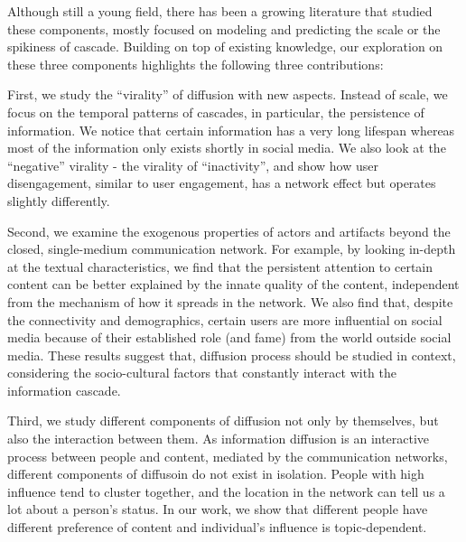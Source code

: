 \documentclass[phd,tocprelim]{cornell}
\begin{document}
Although still a young field, there has been a growing literature that studied these components, mostly focused on modeling and predicting the scale or the spikiness of cascade. Building on top of existing knowledge, our exploration on these three components highlights the following three contributions:



First, we study the ``virality'' of diffusion with new aspects. Instead of scale, we focus on the temporal patterns of cascades, in particular, the persistence of information. We notice that certain information has a very long lifespan whereas most of the information only exists shortly in social media. We also look at the ``negative'' virality - the virality of ``inactivity'', and show how user disengagement, similar to user engagement, has a network effect but operates slightly differently.

Second, we examine the exogenous properties of actors and artifacts beyond the closed, single-medium communication network. For example, by looking in-depth at the textual characteristics, we find that the persistent attention to certain content can be better explained by the innate quality of the content, independent from the mechanism of how it spreads in the network. We also find that, despite the connectivity and demographics, certain users are more influential on social media because of their established role (and fame) from the world outside social media. These results suggest that, diffusion process should be studied in context, considering the socio-cultural factors that constantly interact with the information cascade.


Third, we study different components of diffusion not only by themselves, but also the interaction between them. As information diffusion is an interactive process between people and content, mediated by the communication networks, different components of diffusoin do not exist in isolation. People with high influence tend to cluster together\cite{Aral-2012}, and the location in the network can tell us a lot about a person's status\cite{Kempe-2003,Backstrom:2006}. In our work, we show that different people have different preference of content and individual's influence is topic-dependent.
\end{document}
